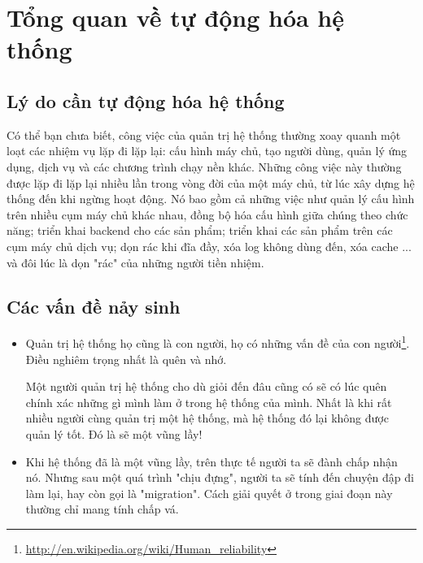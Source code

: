 \chapter{Tổng quan về tự động hóa hệ thống}

\section{Lý do cần tự động hóa hệ thống}
Có thể bạn chưa biết, công việc của quản trị hệ thống thường xoay quanh một loạt các nhiệm vụ lặp đi lặp lại: cấu hình máy chủ, tạo người dùng, quản lý ứng dụng, dịch vụ và các chương trình chạy nền khác. Những công việc này thường được lặp đi lặp lại nhiều lần trong vòng đời của một máy chủ, từ lúc xây dựng hệ thống đến khi ngừng hoạt động. Nó bao gồm cả những việc như quản lý cấu hình trên nhiều cụm máy chủ khác nhau, đồng bộ hóa cấu hình giữa chúng theo chức năng; triển khai backend cho các sản phẩm; triển khai các sản phẩm trên các cụm máy chủ dịch vụ; dọn rác khi đĩa đầy, xóa log không dùng đến, xóa cache ... và đôi lúc là dọn "rác" của những người tiền nhiệm.

\newpage
\section{Các vấn đề nảy sinh}
\begin{itemize}
\item Quản trị hệ thống họ cũng là con người, họ có những vấn đề của con người\footnote{\url{http://en.wikipedia.org/wiki/Human_reliability}}. Điều nghiêm trọng nhất là quên và nhớ.

Một người quản trị hệ thống cho dù giỏi đến đâu cũng có sẽ có lúc quên chính xác những gì mình làm ở trong hệ thống của mình. Nhất là khi rất nhiều người cùng quản trị một hệ thống, mà hệ thống đó lại không được quản lý tốt. Đó là sẽ một vũng lầy!

\item Khi hệ thống đã là một vũng lầy, trên thực tế người ta sẽ đành chấp nhận nó. Nhưng sau một quá trình "chịu đựng", người ta sẽ tính đến chuyện đập đi làm lại, hay còn gọi là "migration". Cách giải quyết ở trong giai đoạn này thường chỉ mang tính chấp vá.

\end{itemize}


\newpage
